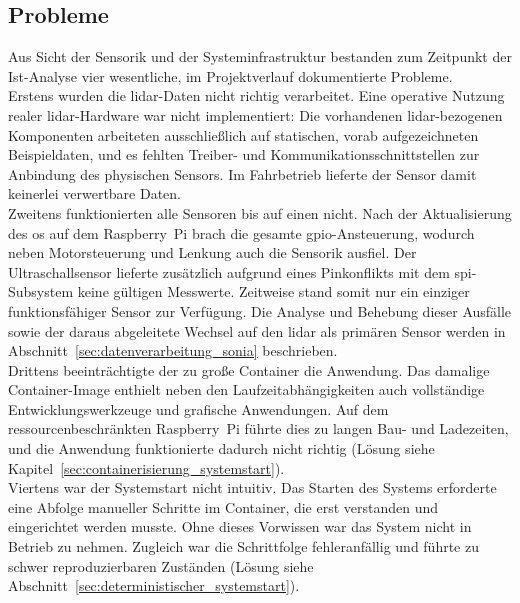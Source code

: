 \subsection{Probleme}
\label{sec:probleme}
Aus Sicht der Sensorik und der Systeminfrastruktur bestanden zum Zeitpunkt der Ist-Analyse vier wesentliche, im Projektverlauf dokumentierte Probleme.
\\
Erstens wurden die \gls{lidar}-Daten nicht richtig verarbeitet. Eine operative Nutzung realer \gls{lidar}-Hardware war nicht implementiert: Die vorhandenen \gls{lidar}-bezogenen Komponenten arbeiteten ausschließlich auf statischen, vorab aufgezeichneten Beispieldaten, und es fehlten Treiber- und Kommunikationsschnittstellen zur Anbindung des physischen Sensors. Im Fahrbetrieb lieferte der Sensor damit keinerlei verwertbare Daten.
\\
Zweitens funktionierten alle Sensoren bis auf einen nicht. Nach der Aktualisierung des \gls{os} auf dem Raspberry~Pi brach die gesamte \gls{gpio}-Ansteuerung, wodurch neben Motorsteuerung und Lenkung auch die Sensorik ausfiel. Der Ultraschallsensor lieferte zusätzlich aufgrund eines Pinkonflikts mit dem \gls{spi}-Subsystem keine gültigen Messwerte. Zeitweise stand somit nur ein einziger funktionsfähiger Sensor zur Verfügung. Die Analyse und Behebung dieser Ausfälle sowie der daraus abgeleitete Wechsel auf den \gls{lidar} als primären Sensor werden in Abschnitt~\ref{sec:datenverarbeitung_sonia} beschrieben.
\\
Drittens beeinträchtigte der zu große Container die Anwendung. Das damalige Container-Image enthielt neben den Laufzeitabhängigkeiten auch vollständige Entwicklungswerkzeuge und grafische Anwendungen. Auf dem ressourcenbeschränkten Raspberry~Pi führte dies zu langen Bau- und Ladezeiten, und die Anwendung funktionierte dadurch nicht richtig (Lösung siehe Kapitel~\ref{sec:containerisierung_systemstart}).
\\
Viertens war der Systemstart nicht intuitiv. Das Starten des Systems erforderte eine Abfolge manueller Schritte im Container, die erst verstanden und eingerichtet werden musste. Ohne dieses Vorwissen war das System nicht in Betrieb zu nehmen. Zugleich war die Schrittfolge fehleranfällig und führte zu schwer reproduzierbaren Zuständen (Lösung siehe Abschnitt~\ref{sec:deterministischer_systemstart}).
